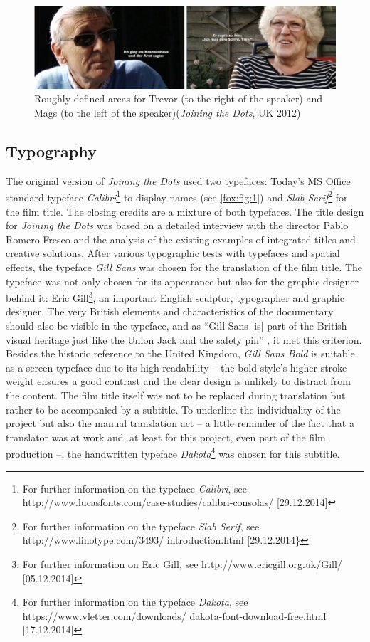 \documentclass[output=paper]{langsci/langscibook}
\begin{document}
\begin{figure}
 \includegraphics[width=\textwidth]{figures/Fox5.png}
 \caption{Roughly defined areas for Trevor (to the right of the speaker) and Mags (to the left of the speaker)(\textit{Joining the Dots}, UK 2012)}
 \label{fox:fig:5}
\end{figure} 


\subsection{Typography}

The original version of \textit{Joining the Dots} used two typefaces: Today's MS Office standard typeface \textit{Calibri}\footnote{For further information on the typeface \textit{Calibri}, see http://www.lucasfonts.com/case-studies/calibri-consolas/ [29.12.2014]} to display names (see \autoref{fox:fig:1}) and \textit{Slab Serif}\footnote{For further information on the typeface \textit{Slab Serif}, see http://www.linotype.com/3493/ introduction.html [29.12.2014\}} for the film title. The closing credits are a mixture of both typefaces. The title design for \textit{Joining the Dots} was based on a detailed interview with the director Pablo Romero-Fresco and the analysis of the existing examples of integrated titles and creative solutions. After various typographic tests with typefaces and spatial effects, the typeface \textit{Gill Sans} was chosen for the translation of the film title. The typeface was not only chosen for its appearance but also for the graphic designer behind it: Eric Gill\footnote{For further information on Eric Gill, see http://www.ericgill.org.uk/Gill/ [05.12.2014]}, an important English sculptor, typographer and graphic designer. The very British elements and characteristics of the documentary should also be visible in the typeface, and as ``Gill Sans [is] part of the British visual heritage just like the Union Jack and the safety pin'' \citep{WQ01}, it met this criterion. Besides the historic reference to the United Kingdom, \textit{Gill Sans Bold} is suitable as a screen typeface due to its high readability – the bold style's higher stroke weight ensures a good contrast and the clear design is unlikely to distract from the content. The film title itself was not to be replaced during translation but rather to be accompanied by a subtitle. To underline the individuality of the project but also the manual translation act – a little reminder of the fact that a translator was at work and, at least for this project, even part of the film production –, the handwritten typeface \textit{Dakota}\footnote{For further information on the typeface \textit{Dakota}, see https://www.vletter.com/downloads/ dakota-font-download-free.html [17.12.2014]} was chosen for this subtitle.
\end{document}
